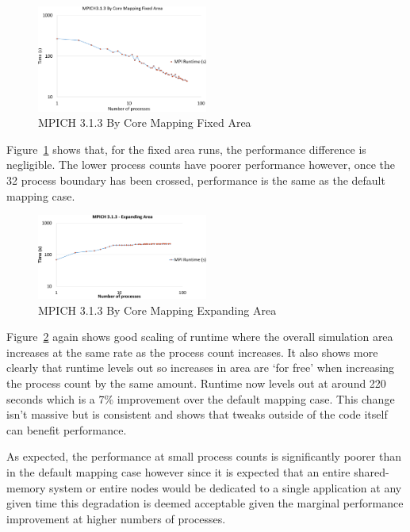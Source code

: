 \begin{figure}
    \includegraphics[page=1,width=0.5\textwidth]
    {graphs/MPICH313-by-core-mapping-fixed-area-crop.pdf}
    \caption{MPICH 3.1.3 By Core Mapping Fixed Area}
    \label{fig:mpichbycoremappingfixedarea}
\end{figure}

Figure~\ref{fig:mpichbycoremappingfixedarea} shows that, for the fixed area
runs, the performance difference is negligible. The lower process counts have
poorer performance however, once the 32 process boundary has been crossed,
performance is the same as the default mapping case.

\begin{figure}
    \includegraphics[page=1,width=0.5\textwidth]
    {graphs/MPICH313-by-core-mapping-expanding-area-crop.pdf}
    \caption{MPICH 3.1.3 By Core Mapping Expanding Area}
    \label{fig:mpichbycoremappingexpandingarea}
\end{figure}

Figure~\ref{fig:mpichbycoremappingexpandingarea} again shows good scaling of
runtime where the overall simulation area increases at the same rate as the
process count increases. It also shows more clearly that runtime levels out so
increases in area are `for free' when increasing the process count by the same
amount. Runtime now levels out at around 220 seconds which is a 7\% improvement
over the default mapping case. This change isn't massive but is consistent and
shows that tweaks outside of the code itself can benefit performance.

As expected, the performance at small process counts is significantly poorer
than in the default mapping case however since it is expected that an entire
shared-memory system or entire nodes would be dedicated to a single application
at any given time this degradation is deemed acceptable given the marginal
performance improvement at higher numbers of processes.

